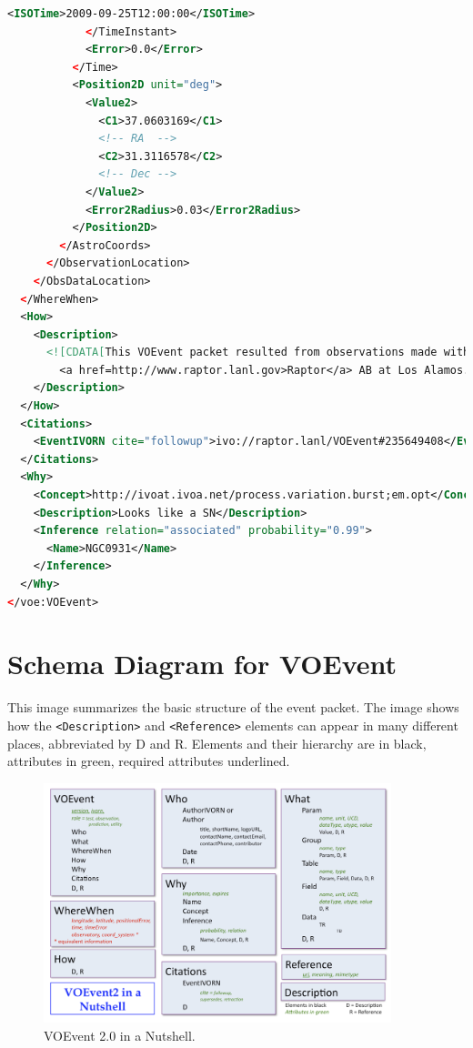\documentclass[11pt,a4paper]{ivoa}
\begin{document}
\begin{lstlisting}[language=XML]
              <ISOTime>2009-09-25T12:00:00</ISOTime>
            </TimeInstant>
            <Error>0.0</Error>
          </Time>
          <Position2D unit="deg">
            <Value2>
              <C1>37.0603169</C1>
              <!-- RA  -->
              <C2>31.3116578</C2>
              <!-- Dec -->
            </Value2>
            <Error2Radius>0.03</Error2Radius>
          </Position2D>
        </AstroCoords>
      </ObservationLocation>
    </ObsDataLocation>
  </WhereWhen>
  <How>
    <Description>
      <![CDATA[This VOEvent packet resulted from observations made with 
        <a href=http://www.raptor.lanl.gov>Raptor</a> AB at Los Alamos. ]]>
    </Description>
  </How>
  <Citations>
    <EventIVORN cite="followup">ivo://raptor.lanl/VOEvent#235649408</EventIVORN>
  </Citations>
  <Why>
    <Concept>http://ivoat.ivoa.net/process.variation.burst;em.opt</Concept>
    <Description>Looks like a SN</Description>
    <Inference relation="associated" probability="0.99">
      <Name>NGC0931</Name>
    </Inference>
  </Why>
</voe:VOEvent>
\end{lstlisting}

\section{Schema Diagram for VOEvent}
\label{sec:5}
This image summarizes the basic structure of the event packet. The image shows 
how the {\tt <Description>} and {\tt <Reference>} elements can appear in many 
different places, abbreviated by D and R. Elements and their hierarchy are in 
black, attributes in green, required attributes underlined.
\begin{figure}[th]
\begin{center}
\includegraphics[width=0.9\textwidth]{nutshell.png} \end{center}
\caption{VOEvent 2.0 in a Nutshell.}
\label{fig:nutshell}
\end{figure}
\end{document}
